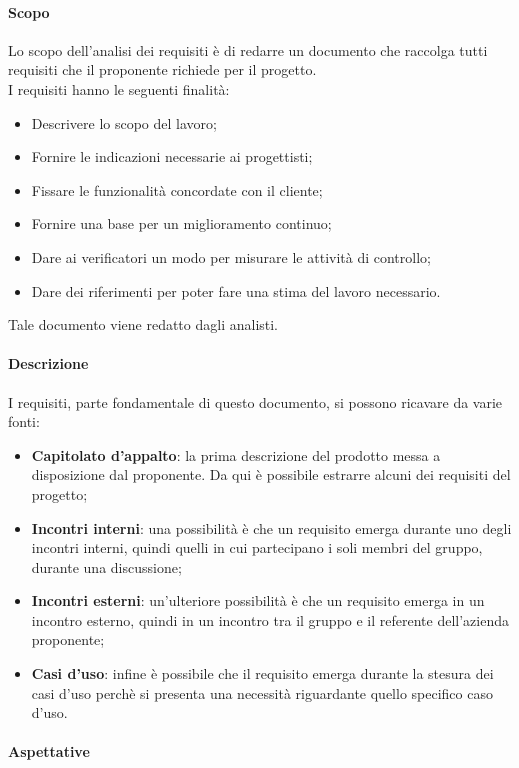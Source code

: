 \documentclass[../norme_di_progetto.tex]{subfiles}
\begin{document}
\paragraph{Scopo}
Lo scopo dell'analisi dei requisiti è di redarre un documento che raccolga tutti requisiti che il proponente richiede per il progetto.\\
I requisiti hanno le seguenti finalità:
\begin{itemize}
    \item Descrivere lo scopo del lavoro;
    \item Fornire le indicazioni necessarie ai progettisti;
    \item Fissare le funzionalità concordate con il cliente;
    \item Fornire una base per un miglioramento continuo;
    \item Dare ai verificatori un modo per misurare le attività di controllo;
    \item Dare dei riferimenti per poter fare una stima del lavoro necessario.
\end{itemize}
Tale documento viene redatto dagli analisti.

\paragraph{Descrizione}
I requisiti, parte fondamentale di questo documento, si possono ricavare da varie fonti:
\begin{itemize}
    \item \textbf{Capitolato d'appalto}: la prima descrizione del prodotto messa a disposizione dal proponente. Da qui è possibile estrarre alcuni dei requisiti del progetto;
    \item \textbf{Incontri interni}: una possibilità è che un requisito emerga durante uno degli incontri interni, quindi quelli in cui partecipano i soli membri del gruppo, durante una discussione;
    \item \textbf{Incontri esterni}: un'ulteriore possibilità è che un requisito emerga in un incontro esterno, quindi in un incontro tra il gruppo e il referente dell'azienda proponente;
    \item \textbf{Casi d'uso}: infine è possibile che il requisito emerga durante la stesura dei casi d'uso perchè si presenta una necessità riguardante quello specifico caso d'uso.
\end{itemize}

\paragraph{Aspettative}
\end{document}
